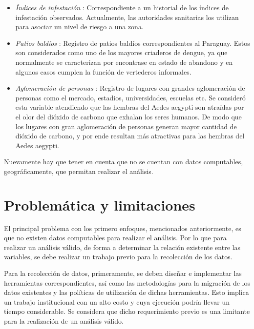 \begin{itemize}
    \item \textit{Índices de infestación} : Correspondiente a un historial de los índices de infestación observados. Actualmente, las autoridades sanitarias los utilizan para asociar un nivel de riesgo a una zona.

    \item \textit{Patios baldíos} : Registro de patios baldíos correspondientes al Paraguay. Estos son considerados como uno de los mayores criaderos de dengue, ya que normalmente se caracterizan por encontrase en estado de abandono y en algunos casos cumplen la función de vertederos informales.

    \item \textit{Aglomeración de personas} : Registro de lugares con grandes aglomeración de personas como el mercado, estadios, universidades, escuelas etc. Se consideró esta variable atendiendo que las hembras del Aedes aegypti son atraídas por el olor del dióxido de carbono que exhalan los seres humanos. De modo que los lugares con gran aglomeración de personas generan mayor cantidad de dióxido de carbono, y por ende resultan más atractivas para las hembras del Aedes aegypti.
\end{itemize}


Nuevamente hay que tener en cuenta que no se cuentan con datos computables, geográficamente, que
permitan realizar el análisis.

\section{Problemática y limitaciones}

El principal problema con los primero enfoques, mencionados anteriormente, es que no existen datos
computables para realizar el análisis. Por lo que para realizar un análisis válido, de forma a
determinar la relación existente entre las variables, se debe realizar un trabajo previo para
la recolección de los datos.

Para la recolección de datos, primeramente, se deben diseñar e implementar las herramientas
correspondientes, así como las metodologías para la migración de los datos existentes y las
políticas de utilización de dichas herramientas. Esto implica un trabajo institucional con un alto
costo y cuya ejecución podría llevar un tiempo considerable. Se considera que dicho requerimiento
previo es una limitante para la realización de un análisis válido.


